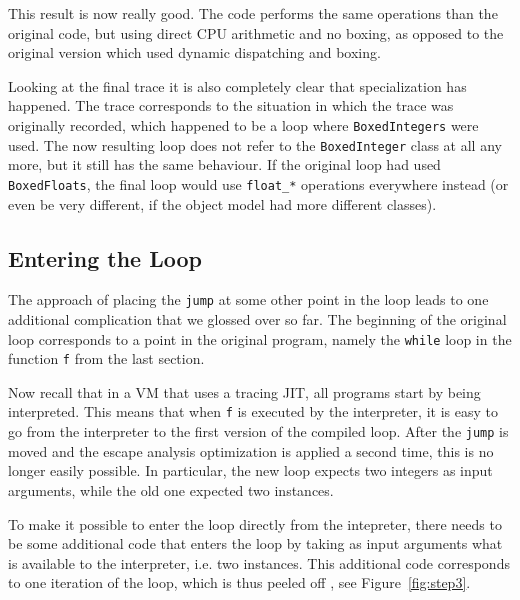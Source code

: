 \documentclass{sigplanconf}
\let\oldcite=\cite
\renewcommand\cite[1]{\ifthenelse{\equal{#1}{XXX}}{[citation~needed]}{\oldcite{#1}}}
\begin{document}
This result is now really good. The code performs the same operations than
the original code, but using direct CPU arithmetic and no boxing, as opposed to
the original version which used dynamic dispatching and boxing.

Looking at the final trace it is also completely clear that specialization has
happened. The trace corresponds to the situation in which the trace was
originally recorded, which happened to be a loop where \texttt{BoxedIntegers} were
used. The now resulting loop does not refer to the \texttt{BoxedInteger} class at
all any more, but it still has the same behaviour. If the original loop had
used \texttt{BoxedFloats}, the final loop would use \texttt{float\_*} operations
everywhere instead (or even be very different, if the object model had
more different classes).



\subsection{Entering the Loop}

The approach of placing the \texttt{jump} at some other point in the loop leads to
one additional complication that we glossed over so far. The beginning of the
original loop corresponds to a point in the original program, namely the
\texttt{while} loop in the function \texttt{f} from the last section.

Now recall that in a VM that uses a tracing JIT, all programs start by being
interpreted. This means that when \texttt{f} is executed by the interpreter, it is
easy to go from the interpreter to the first version of the compiled loop.
After the \texttt{jump} is moved and the escape analysis optimization is applied a
second time, this is no longer easily possible.  In particular, the new loop
expects two integers as input arguments, while the old one expected two
instances.

To make it possible to enter the loop directly from the intepreter, there
needs to be some additional code that enters the loop by taking as input
arguments what is available to the interpreter, i.e. two instances. This
additional code corresponds to one iteration of the loop, which is thus
peeled off \cite{XXX}, see Figure~\ref{fig:step3}.
\end{document}

